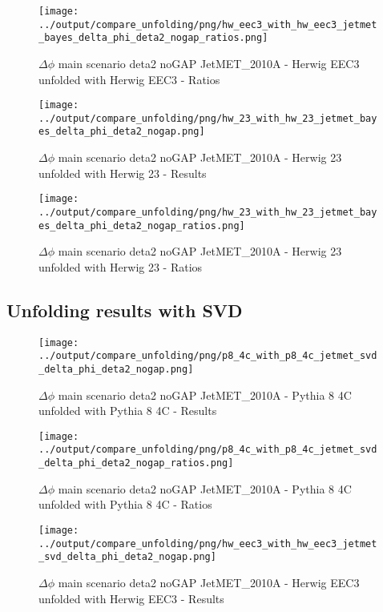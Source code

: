 \documentclass[11pt]{book}
\begin{document}
\begin{figure}[ht]
\centering
\texttt{[image: ../output/compare\_unfolding/png/hw\_eec3\_with\_hw\_eec3\_jetmet\_bayes\_delta\_phi\_deta2\_nogap\_ratios.png]}
\caption{$\Delta\phi$ main scenario deta2 noGAP JetMET\_2010A - Herwig EEC3 unfolded with Herwig EEC3 - Ratios}
\label{hw_eec3_hw_eec3_jetmet_bayes_delta_phi_deta2_nogap_b}
\end{figure}

\begin{figure}[ht]
\centering
\texttt{[image: ../output/compare\_unfolding/png/hw\_23\_with\_hw\_23\_jetmet\_bayes\_delta\_phi\_deta2\_nogap.png]}
\caption{$\Delta\phi$ main scenario deta2 noGAP JetMET\_2010A - Herwig 23 unfolded with Herwig 23 - Results}
\label{hw_23_hw_23_jetmet_bayes_delta_phi_deta2_nogap_a}
\end{figure}

\begin{figure}[ht]
\centering
\texttt{[image: ../output/compare\_unfolding/png/hw\_23\_with\_hw\_23\_jetmet\_bayes\_delta\_phi\_deta2\_nogap\_ratios.png]}
\caption{$\Delta\phi$ main scenario deta2 noGAP JetMET\_2010A - Herwig 23 unfolded with Herwig 23 - Ratios}
\label{hw_23_hw_23_jetmet_bayes_delta_phi_deta2_nogap_b}
\end{figure}


\clearpage
\subsection{Unfolding results with SVD}

\begin{figure}[ht]
\centering
\texttt{[image: ../output/compare\_unfolding/png/p8\_4c\_with\_p8\_4c\_jetmet\_svd\_delta\_phi\_deta2\_nogap.png]}
\caption{$\Delta\phi$ main scenario deta2 noGAP JetMET\_2010A - Pythia 8 4C unfolded with Pythia 8 4C - Results}
\label{p8_p8_jetmet_svd_delta_phi_deta2_nogap_a}
\end{figure}

\begin{figure}[ht]
\centering
\texttt{[image: ../output/compare\_unfolding/png/p8\_4c\_with\_p8\_4c\_jetmet\_svd\_delta\_phi\_deta2\_nogap\_ratios.png]}
\caption{$\Delta\phi$ main scenario deta2 noGAP JetMET\_2010A - Pythia 8 4C unfolded with Pythia 8 4C - Ratios}
\label{p8_p8_jetmet_svd_delta_phi_deta2_nogap_b}
\end{figure}

\begin{figure}[ht]
\centering
\texttt{[image: ../output/compare\_unfolding/png/hw\_eec3\_with\_hw\_eec3\_jetmet\_svd\_delta\_phi\_deta2\_nogap.png]}
\caption{$\Delta\phi$ main scenario deta2 noGAP JetMET\_2010A - Herwig EEC3 unfolded with Herwig EEC3 - Results}
\label{hw_eec3_hw_eec3_jetmet_svd_delta_phi_deta2_nogap_a}
\end{figure}
\end{document}
